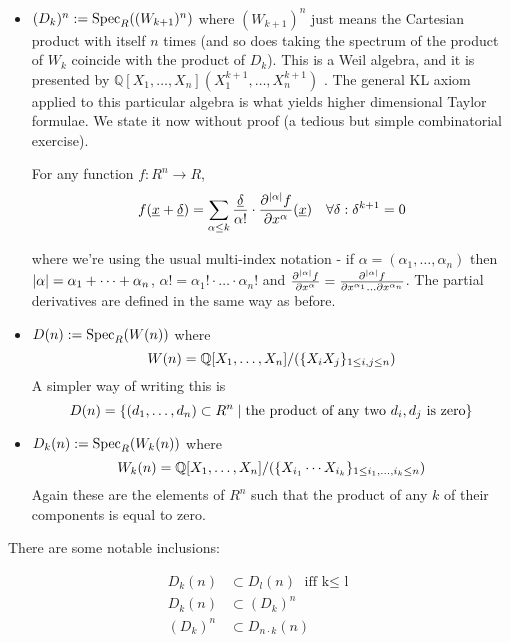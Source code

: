 \begin{itemize}
  \item \( (D_k)^n := \operatorname{Spec}_R((W_{k+1})^n) \) where \( (W_{k+1})^n \) just means the Cartesian product with itself \( n \) times (and so does taking the spectrum of the product of \( W_k \) coincide with the product of \( D_k \)). This is a Weil algebra, and it is presented by \( \mathbb{Q}[X_1,\dots,X_n](X_1^{k+1},\dots,X_n^{k+1}) \) . The general KL axiom applied to this particular algebra is what yields higher dimensional Taylor formulae. We state it now without proof (a tedious but simple combinatorial exercise).
    \begin{proposition}
      For any function \( f:R^n\to R \),
      \begin{equation*}
	f( \underline{x} + \underline{\delta} ) = \sum_{\alpha \leq k}{\frac{\underline{\delta}}{\alpha!}\cdot\frac{\partial^{\lvert \alpha \rvert}f}{\partial x^\alpha}(\underline{x})}\quad \forall \delta : \delta^{k+1}=0
      \end{equation*}
    \end{proposition}
    where we're using the usual multi-index notation - if \( \alpha=(\alpha_1,\dots,\alpha_n) \) then \( \lvert \alpha \rvert = \alpha_1+\dots+\alpha_n \), \( \alpha! = \alpha_1!\cdot\dots\cdot\alpha_n! \) and \( \frac{\partial^{\lvert \alpha \rvert}f}{\partial x^\alpha}=\frac{\partial^{\lvert \alpha \rvert}f}{\partial x^{\alpha_1}\dots\partial x^{\alpha_n}} \). The partial derivatives are defined in the same way as before.
  \item \( D(n) := \operatorname{Spec}_R(W(n)) \) where 
    \begin{equation*}
        W(n) = \mathbb{Q}[X_1,\dots,X_n]/(\{X_iX_j\}_{1\leq i,j \leq n})
    \end{equation*}
    A simpler way of writing this is
    \begin{equation*}
      D(n) = \{(d_1,\dots,d_n)\subset R^n\mid \text{the product of any two \( d_i,d_j \) is zero}\}
    \end{equation*}
  \item \( D_k(n) := \operatorname{Spec}_R(W_k(n)) \) where
    \begin{equation*}
      W_k(n) = \mathbb{Q}[X_1,\dots,X_n]/(\{X_{i_1}\cdots X_{i_k}\}_{1\leq i_1,\dots,i_k\leq n})
    \end{equation*}
   Again these are the elements of \( R^n \) such that the product of any \( k \) of their components is equal to zero.
\end{itemize}

There are some notable inclusions:

\begin{align*}
  D_k(n)  &\subset D_l(n)             \text{ iff k\(\leq\) l} \\
  D_k(n)  &\subset (D_k)^n            \\
  (D_k)^n &\subset D_{n\cdot k}(n)   
\end{align*}

